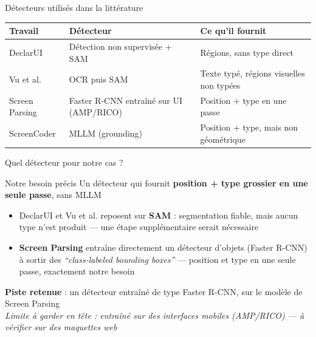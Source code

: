 \documentclass[11pt,aspectratio=169]{beamer}
\begin{document}
\begin{frame}{Détecteurs utilisés dans la littérature}
  \small
  \renewcommand{\arraystretch}{1.5}
  \begin{tabular}{@{}p{2.6cm}p{4.4cm}p{4.6cm}@{}}
    \toprule
    \textbf{Travail} & \textbf{Détecteur} & \textbf{Ce qu'il fournit} \\
    \midrule
    DeclarUI \cite{declarui} & Détection non supervisée + SAM & Régions, sans type direct \\
    Vu et al. \cite{multimodalgraph} & OCR puis SAM & Texte typé, régions visuelles non typées \\
    Screen Parsing \cite{screenparsing} & Faster R-CNN entraîné sur UI (AMP/RICO) & \alert{Position + type en une passe} \\
    ScreenCoder \cite{screencoder} & MLLM (grounding) & Position + type, mais non géométrique \\
    \bottomrule
  \end{tabular}
\end{frame}

\begin{frame}{Quel détecteur pour notre cas ?}
  \begin{block}{Notre besoin précis}
    Un détecteur qui fournit \textbf{position + type grossier en une seule passe}, sans MLLM
  \end{block}
  \vspace{4mm}
  \begin{itemize}
    \item DeclarUI et Vu et al. reposent sur \textbf{SAM} : segmentation fiable, mais \alert{aucun type} n'est produit --- une étape supplémentaire serait nécessaire
    \item \textbf{Screen Parsing} \cite{screenparsing} entraîne directement un détecteur d'objets (Faster R-CNN) à sortir des \textit{``class-labeled bounding boxes''} --- position et type en une seule passe, exactement notre besoin
  \end{itemize}
  \vspace{4mm}
  \begin{center}
  \alert{\textbf{Piste retenue}} : un détecteur entraîné de type Faster R-CNN, sur le modèle de Screen Parsing
  \\[2pt]
  \small \textit{Limite à garder en tête : entraîné sur des interfaces mobiles (AMP/RICO) --- à vérifier sur des maquettes web}
  \end{center}
\end{frame}
\end{document}

